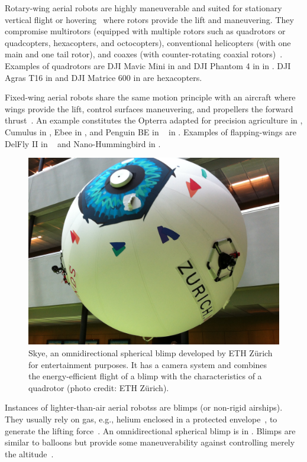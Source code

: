 Rotary-wing aerial robots are highly maneuverable and suited for stationary vertical flight or hovering~\citep{siciliano2016springer} where rotors provide the lift and maneuvering. They compromise multirotors (equipped with multiple rotors such as quadrotors or quadcopters, hexacopters, and octocopters), conventional helicopters (with one main and one tail rotor), and coaxes (with counter-rotating coaxial rotors)~\citep{corke2017robotics}. Examples of quadrotors are DJI Mavic Mini in  and DJI Phantom 4 in  in . DJI Agras T16 in  and DJI Matrice 600 in  are hexacopters.

Fixed-wing aerial robots share the same motion principle with an aircraft where wings provide the lift, control surfaces maneuvering, and propellers the forward thrust~\citep{corke2017robotics}. An example constitutes the Opterra adapted for precision agriculture in , Cumulus in , Ebee in , and Penguin BE in ~\citep{haugen2016monitoring} in . Examples of flapping-wings are DelFly II in ~\citep{percin2012flow,groen2010improving,clercq2009aerodynamic} and Nano-Hummingbird in . 

\begin{figure}[t]
  \centering
  \includegraphics[width=.7\textwidth]{pictures/IMG_2612}
  \caption[Skye, an omnidirectional spherical blimp]{Skye, an omnidirectional spherical blimp developed by ETH Z\"urich for entertainment purposes. It has a camera system and combines the energy-efficient flight of a blimp with the characteristics of a quadrotor {\scriptsize(photo credit: ETH Z\"urich)}.}   
  \label{fig:skye-blimp}
\end{figure}
Instances of lighter-than-air aerial robotss are blimps (or non-rigid airships). They usually rely on gas, e.g., helium enclosed in a protected envelope~\citep{burri2013design}, to generate the lifting force~\citep{fui2017recent}. An omnidirectional spherical blimp is in . Blimps are similar to balloons but provide some maneuverability against controlling merely the altitude~\citep{colombatti2011lighter}.

